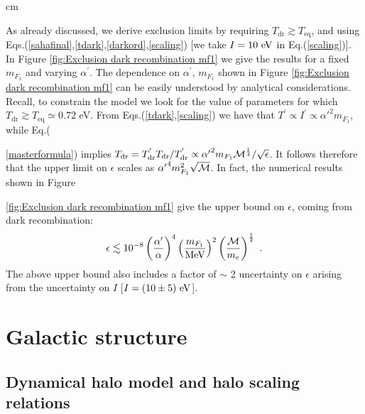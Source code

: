 \documentclass[12pt]{article}
\begin{document}
 cm

As already discussed, we derive exclusion limits by requiring $T _{\text{dr}} \gtrsim T _{\text{eq}}$, and using Eqs.(\ref{sahafinal},\ref{tdark},\ref{darkord},\ref{scaling}) [we take $I = 10 \ {\rm eV}$ in Eq.(\ref{scaling})]. In Figure \ref{fig:Exclusion dark recombination mf1} we give the results for a fixed $m _{F_1}$ and varying $\alpha ^{'}$. The dependence on $\alpha ^{'}$, $m _{F_1}$ shown in Figure \ref{fig:Exclusion dark recombination mf1} can be easily understood by analytical considerations. Recall, to constrain the model we look for the value of parameters for which $T _{\text{dr}} \gtrsim T _{\text{eq}} \simeq 0.72$ eV. From Eqs.(\ref{tdark},\ref{scaling}) we have that $T ^{'} \propto I ^{'} \propto {\alpha '} ^2 m _{F_1}$, while Eq.({\ref{masterformula}) implies $T _{\text{dr}} = T _{\text{dr}} ^{'}T _{\text{dr}}/T _{\text{dr}} ^{'} \propto {\alpha '} ^2m _{F_1}{\cal M} ^{\frac{1}{4}}/\sqrt{\epsilon}$. It follows therefore that the upper limit on $\epsilon$ scales as ${\alpha '} ^4 m _{F_1} ^2\sqrt{\cal M}$. In fact, the numerical results shown in Figure {\ref{fig:Exclusion dark recombination mf1} give the upper bound on $\epsilon$, coming from dark recombination:
%
\begin{eqnarray}
\epsilon \lesssim 10 ^{-8} \left ( \frac{\alpha '}{\alpha} \right ) ^4 \left ( \frac{m _{F_1}}{\rm MeV} \right ) ^2 \left ( \frac{{\cal M}}{m _e} \right ) ^{\frac{1}{2}} \ .
\label{boundse}
\end{eqnarray}
% 
The above upper bound also includes a factor of $\sim$ 2 uncertainty on $\epsilon$ arising from the uncertainty on $I$ [$I = (10 \pm 5) \ {\rm eV}$].

\section{Galactic structure}

\subsection{Dynamical halo model and halo scaling relations}

}}
\end{document}
